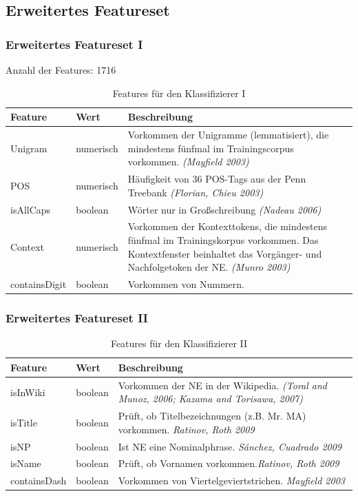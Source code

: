\documentclass{beamer}
\begin{document}
	\subsection{Erweitertes Featureset}
	\begin{frame}
		\frametitle{Erweitertes Featureset I}
		Anzahl der Features: 1716
 			\begin{table}
 				\caption{Features für den Klassifizierer I}
 				\begin{tabularx}{\textwidth}{llX}
 					\toprule
 					Feature & Wert & Beschreibung\\
 					\midrule
 					Unigram & numerisch & Vorkommen der Unigramme (lemmatisiert), die mindestens fünfmal im Trainingscorpus vorkommen. \textit{(Mayfield 2003)}\\
 					POS & numerisch & Häufigkeit von 36 POS-Tags aus der Penn Treebank \textit{(Florian, Chieu 2003)}\\
 					isAllCaps & boolean & Wörter nur in Großschreibung \textit{(Nadeau 2006)}\\
 					Context & numerisch & Vorkommen der Kontexttokens, die mindestens fünfmal im Trainingskorpus vorkommen. Das Kontextfenster beinhaltet das Vorgänger- und Nachfolgetoken der NE. \textit{(Munro 2003)}\\
 					containsDigit & boolean & Vorkommen von Nummern. \textit{}\\
 					\bottomrule
 				\end{tabularx}
 				\label{tab:allf1}
 			\end{table}
 	\end{frame}
 		\begin{frame}
 			\frametitle{Erweitertes Featureset II}
 					\begin{table}
 						\caption{Features für den  Klassifizierer II}
 						\begin{tabularx}{\textwidth}{llX}
 							\toprule
 							Feature & Wert & Beschreibung\\
 							\midrule
 							isInWiki & boolean & Vorkommen der NE in der Wikipedia. \textit{(Toral and Munoz, 2006; Kazama and Torisawa, 2007)}\\
 							isTitle & boolean & Prüft, ob Titelbezeichnungen (z.B. Mr. MA) vorkommen. \textit{Ratinov, Roth 2009}\\
 							isNP & boolean & Ist NE eine Nominalphrase. \textit{Sánchez, Cuadrado 2009}\\
 							isName & boolean & Prüft, ob Vornamen vorkommen.\textit{Ratinov, Roth 2009}\\
 							containsDash & boolean & Vorkommen von Viertelgeviertstrichen. \textit{Mayfield 2003}\\
 							\bottomrule
 						\end{tabularx}
 						\label{tab:allf2}
 					\end{table}
 		\end{frame}
\end{document}
